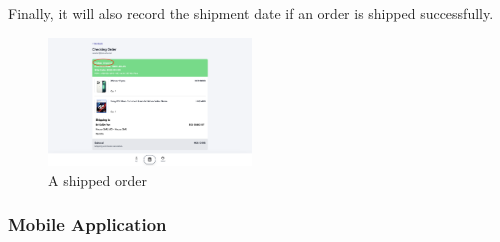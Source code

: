 \documentclass{article}
\begin{document}
\\\\
Finally, it will also record the shipment date if an order is shipped successfully.
\begin{figure}[!htp]
    \centering
    \includegraphics[width=0.48\textwidth]{shipped.png}
    \caption{\label{fig:shipped}A shipped order}
\end{figure}

\subsubsection{Mobile Application}
\end{document}
